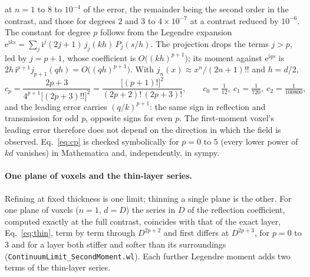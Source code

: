 \documentclass[11pt,a4paper]{article}
\newcommand{\nb}[1]{\texttt{#1}}
\begin{document}
at $n=1$ to $8$ to $10^{-4}$ of the error, the remainder being the second order in the contrast, and
those for degrees $2$ and $3$ to $4\times10^{-7}$ at a contrast reduced by $10^{-6}$. The constant for
degree $p$ follows from the Legendre expansion
$\mathrm{e}^{\mathrm{i}ks}=\sum_j\mathrm{i}^j(2j+1)\,j_j(kh)\,P_j(s/h)$. The projection drops the terms
$j>p$, led by $j=p+1$, whose coefficient is $O\bigl((kh)^{p+1}\bigr)$; its moment against
$\mathrm{e}^{\mathrm{i}qs}$ is $2h\,\mathrm{i}^{p+1}j_{p+1}(qh)=O\bigl((qh)^{p+1}\bigr)$. With
$j_n(x)\approx x^n/(2n+1)!!$ and $h=d/2$,
\begin{equation}\label{eq:cp}
  c_p=\frac{2p+3}{4^{p+1}\bigl[(2p+3)!!\bigr]^2}=\frac{\bigl[(p+1)!\bigr]^2}{(2p+2)!\,(2p+3)!},
  \qquad c_0=\tfrac1{12},\ c_1=\tfrac1{720},\ c_2=\tfrac1{100800},
\end{equation}
and the leading error carries $(q/k)^{p+1}$: the same sign in reflection and transmission for odd
$p$, opposite signs for even $p$. The first-moment voxel's leading error therefore does not depend on
the direction in which the field is observed. Eq.~\eqref{eq:cp} is checked symbolically for $p=0$ to
$5$ (every lower power of $kd$ vanishes) in Mathematica and, independently, in sympy.

\paragraph{One plane of voxels and the thin-layer series.} Refining at fixed thickness is one limit;
thinning a single plane is the other. For one plane of voxels ($n=1$, $d=D$) the series in $D$ of the
reflection coefficient, computed exactly at the full contrast, coincides with that of the exact layer,
Eq.~\eqref{eq:thin}, term by term through $D^{2p+2}$ and first differs at $D^{2p+3}$, for $p=0$ to $3$
and for a layer both stiffer and softer than its surroundings (\nb{ContinuumLimit\_SecondMoment.wl}).
Each further Legendre moment adds two terms of the thin-layer series.
\end{document}
